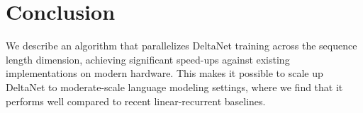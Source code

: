 \vspace{-2mm}
\section{Conclusion}
\vspace{-2mm}
We describe an algorithm that parallelizes DeltaNet training across the sequence length dimension, achieving significant speed-ups against existing implementations on modern hardware. This makes it possible to scale up DeltaNet to moderate-scale language modeling settings, where we find that it performs well compared to recent linear-recurrent baselines. 

